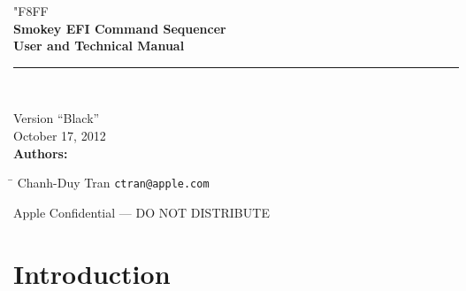 \documentclass[11pt]{article}
\newlength{\BodyIndentLeft}
\newlength{\TransverseMargin}
\newlength{\TopMargin}
\newlength{\BottomMargin}
\newlength{\LeftMargin}
\newcommand{\AppleLogo}{\char"F8FF}
\begin{document}


\begin{titlepage}

\setlength{\parindent}{0in}
{
\fontsize{36}{36}\selectfont
{\color{AppleGray}\AppleLogo} \\[\baselineskip]
\fontsize{28}{36}\selectfont
\textbf{Smokey EFI Command Sequencer} \\[0.1\baselineskip]
\textbf{\color{SmokeyBlue}User and Technical Manual} \\
\rule{\linewidth}{1pt} \\[0.25in]
}

Version ``Black'' \\
October 17, 2012 \\[0.25in]

\textbf{Authors:}
\vspace{-\topsep}
\vspace{-\partopsep}
\begin{tabbing}
\hspace{2in} \= \kill
Chanh-Duy Tran \> \texttt{ctran@apple.com}
\end{tabbing}

\vfill

\begin{center}
Apple Confidential --- DO NOT DISTRIBUTE
\end{center}

\end{titlepage}

\clearpage
\fancyhfoffset[r]{0in}

\setcounter{tocdepth}{2}
\tableofcontents

\clearpage
\fancyhfoffset[l]{\BodyIndentLeft}
\fancyhfoffset[r]{0in}
{}


\section{Introduction}
\end{document}
